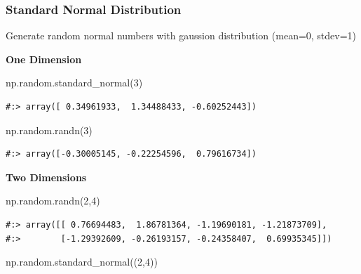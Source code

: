 \documentclass[
]{book}
\newenvironment{Shaded}{\begin{snugshade}}{\end{snugshade}}
\newcommand{\DecValTok}[1]{\textcolor[rgb]{0.06,0.06,0.06}{#1}}
\newcommand{\NormalTok}[1]{#1}
\begin{document}
\hypertarget{standard-normal-distribution}{%
\subsubsection{Standard Normal Distribution}\label{standard-normal-distribution}}

Generate random normal numbers with gaussion distribution (mean=0, stdev=1)

\textbf{One Dimension}

\begin{Shaded}
\begin{Highlighting}[]
\NormalTok{np.random.standard_normal(}\DecValTok{3}\NormalTok{)}
\end{Highlighting}
\end{Shaded}

\begin{verbatim}
#:> array([ 0.34961933,  1.34488433, -0.60252443])
\end{verbatim}

\begin{Shaded}
\begin{Highlighting}[]
\NormalTok{np.random.randn(}\DecValTok{3}\NormalTok{)}
\end{Highlighting}
\end{Shaded}

\begin{verbatim}
#:> array([-0.30005145, -0.22254596,  0.79616734])
\end{verbatim}

\textbf{Two Dimensions}

\begin{Shaded}
\begin{Highlighting}[]
\NormalTok{np.random.randn(}\DecValTok{2}\NormalTok{,}\DecValTok{4}\NormalTok{)}
\end{Highlighting}
\end{Shaded}

\begin{verbatim}
#:> array([[ 0.76694483,  1.86781364, -1.19690181, -1.21873709],
#:>        [-1.29392609, -0.26193157, -0.24358407,  0.69935345]])
\end{verbatim}

\begin{Shaded}
\begin{Highlighting}[]
\NormalTok{np.random.standard_normal((}\DecValTok{2}\NormalTok{,}\DecValTok{4}\NormalTok{))}
\end{Highlighting}
\end{Shaded}
\end{document}
